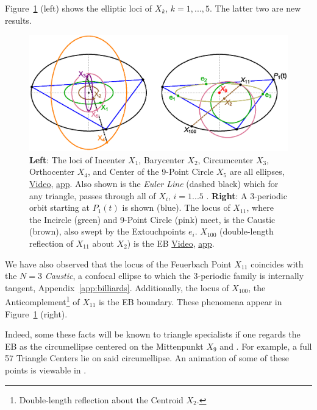 Figure~\ref{fig:x12345-feuer-combo} (left) shows the elliptic loci of $X_k$, $k=1,...,5$. The latter two are new results.

\begin{figure}
\centering
\includegraphics[width=\linewidth]{pics_1040_x12345_feuerbach_combo.eps}
\caption{\textbf{Left}: The loci of Incenter $X_1$, Barycenter $X_2$, Circumcenter $X_3$, Orthocenter $X_4$, and Center of the 9-Point Circle $X_5$ are all ellipses, \href{https://youtu.be/sMcNzcYaqtg}{Video}, \href{https://bit.ly/3opClJq}{app}. Also shown is the {\em Euler Line} (dashed black) which for any triangle, passes through all of $X_i$, $i=1...5$ \cite{mw}. \textbf{Right}: A 3-periodic orbit starting at $P_1(t)$ is shown (blue). The locus of $X_{11}$, where the Incircle (green) and 9-Point Circle (pink) meet, is the Caustic (brown), also swept by the Extouchpoints $e_i$. $X_{100}$ (double-length reflection of $X_{11}$ about $X_2$) is the EB \href{https://youtu.be/TXdg7tUl8lc}{Video}, \href{https://bit.ly/2LuARPo}{app}.}
\label{fig:x12345-feuer-combo}
\end{figure}

We have also observed that the locus of the Feuerbach Point $X_{11}$ coincides with the $N=3$ {\em Caustic}, a confocal ellipse to which the 3-periodic family is internally tangent, Appendix~\ref{app:billiards}. Additionally, the locus of $X_{100}$, the Anticomplement\footnote{Double-length reflection about the Centroid $X_2$.} of $X_{11}$ is the EB boundary. These phenomena appear in Figure~\ref{fig:x12345-feuer-combo} (right).

Indeed, some these facts will be known to triangle specialists if one regards the EB as the circumellipse centered on the Mittenpunkt $X_9$ \cite[X(9)]{etc} and \cite{dekov14}. For example, a full 57 Triangle Centers lie on said circumellipse. An animation of some of these points is viewable in \cite[pl\#10]{dsr_playlist_2020}.


